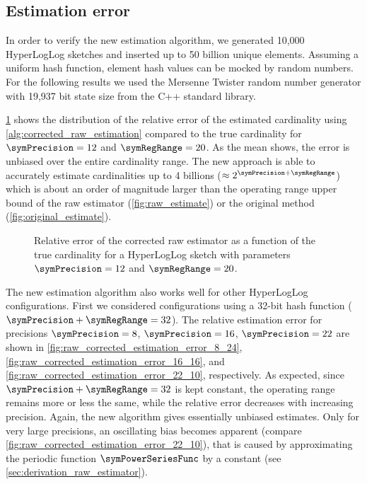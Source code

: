 \documentclass[a4paper]{scrartcl}
\begin{document}
\subsection{Estimation error}
\label{sec:corrected_raw_estimation_error}
In order to verify the new estimation algorithm, we generated 10,000 HyperLogLog sketches and inserted up to 50 billion unique elements. Assuming a uniform hash function, element hash values can be mocked by random numbers. For the following results we used the Mersenne Twister random number generator with 19,937 bit state size from the C++ standard library.

\cref{fig:raw_corrected_estimation_error_12_20} shows the distribution of the relative error of the estimated cardinality using \cref{alg:corrected_raw_estimation} compared to the true cardinality for $\symPrecision=12$ and $\symRegRange=20$. As the mean shows, the error is unbiased over the entire cardinality range. The new approach is able to accurately estimate cardinalities up to 4 billions ($\approx 2^{\symPrecision+\symRegRange}$) which is about an order of magnitude larger than the operating range upper bound of the raw estimator (\cref{fig:raw_estimate}) or the original method (\cref{fig:original_estimate}).

\begin{figure}
\centering

\caption{Relative error of the corrected raw estimator as a function of the true cardinality for a HyperLogLog sketch with parameters $\symPrecision = 12$ and $\symRegRange=20$.}
\label{fig:raw_corrected_estimation_error_12_20}
\end{figure}

The new estimation algorithm also works well for other HyperLogLog configurations. First we considered configurations using a 32-bit hash function ($\symPrecision + \symRegRange = 32$). The relative estimation error for precisions $\symPrecision=8$, $\symPrecision=16$, $\symPrecision=22$ are shown in \cref{fig:raw_corrected_estimation_error_8_24}, \cref{fig:raw_corrected_estimation_error_16_16}, and \cref{fig:raw_corrected_estimation_error_22_10}, respectively. As expected, since  $\symPrecision + \symRegRange = 32$ is kept constant, the operating range remains more or less the same, while the relative error decreases with increasing precision. Again, the new algorithm gives essentially unbiased estimates. Only for very large precisions, an oscillating bias becomes apparent (compare \cref{fig:raw_corrected_estimation_error_22_10}), that is caused by approximating the periodic function $\symPowerSeriesFunc$ by a constant (see \cref{sec:derivation_raw_estimator}).
\end{document}

